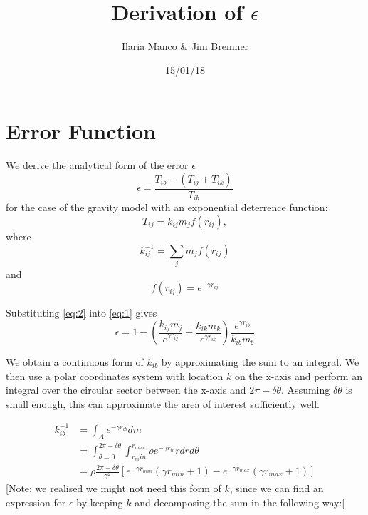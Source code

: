 \documentclass{article}
\title{Derivation of $\epsilon$}
\author{Ilaria Manco \& Jim Bremner}
\date{15/01/18} %
\begin{document}
\maketitle

\section{Error Function}
We derive the analytical form of the error $\epsilon$ 
\begin{equation}\label{eq:1}
\epsilon =  \frac{T_{ib} - (T_{ij} + T_{ik})}{T_{ib}}
\end{equation}
for the case of the gravity model with an exponential deterrence function:
\begin{equation}\label{eq:2}
T_{ij} = k_{ij} m_j f(r_{ij}),
\end{equation}
where 
\begin{equation}\label{eq:3}
k_{ij}^{-1} = \sum_j{m_j f(r_{ij})}
\end{equation}
and
\begin{equation}\label{eq:4}
f(r_{ij}) = e^{-\gamma r_{ij}}
\end{equation}

Substituting \eqref{eq:2} into \eqref{eq:1} gives
\begin{equation}\label{eq:5}
\epsilon = 1 - \left( \frac{k_{ij} m_j}{e^{\gamma r_{ij}}} + \frac{k_{ik} m_k }{e^{\gamma r_{ik}}} \right) \frac{e^{\gamma r_{ib}}}{k_{ib} m_b}
\end{equation}

{\color{red} We obtain a continuous form of $k_{ib}$ by approximating the sum to an integral. We then use a polar coordinates system with location $k$ on the x-axis and perform an integral over the circular sector between the x-axis and $2\pi - \delta \theta$. Assuming $\delta \theta$ is small enough, this can approximate the area of interest sufficiently well.

\begin{equation}\label{eq:6}
\begin{aligned}
k_{ib}^{-1} &= \int_{A}{e^{-\gamma r_{ib}} dm} \\
& = \int_{\theta = 0}^{2\pi - \delta \theta} \int_{r_min}^{r_{max}}{\rho e^{-\gamma r_{ib}} r dr d\theta} \\
& = \rho \frac{2\pi - \delta \theta}{\gamma^2} \left[e^{-\gamma r_{min}} \left( \gamma r_{min} +1 \right) - e^{-\gamma r_{max}} \left( \gamma r_{max} +1 \right) \right]
\end{aligned}
\end{equation}
[Note: we realised we might not need this form of $k$, since we can find an expression for $\epsilon$ by keeping $k$ and decomposing the sum in the following way:]}
\end{document}
